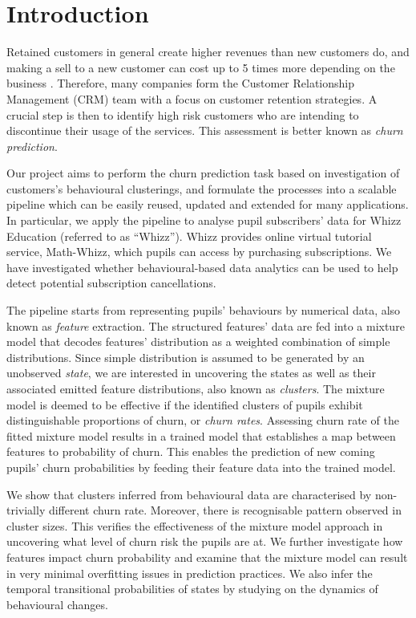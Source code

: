 \section{Introduction}
\label{sec:intro}

Retained customers in general create higher revenues than new customers do, and making a sell to a new customer can cost up to 5 times more depending on the business \cite{Slater2000}. Therefore, many companies form the Customer Relationship Management (CRM) team with a focus on customer retention strategies. A crucial step is then to identify high risk customers who are intending to discontinue their usage of the services. This assessment is better known as \textit{churn prediction}.

Our project aims to perform the churn prediction task based on investigation of customers's behavioural clusterings, and formulate the processes into a scalable pipeline which can be easily reused, updated and extended for many applications. In particular, we apply the pipeline to analyse pupil subscribers' data for Whizz Education (referred to as ``Whizz''). Whizz provides online virtual tutorial service, Math-Whizz, which pupils can access by purchasing subscriptions. We have investigated whether behavioural-based data analytics can be used to help detect potential subscription cancellations.

The pipeline starts from representing pupils' behaviours by numerical data, also known as \textit{feature} extraction. The structured features' data are fed into a mixture model that decodes features' distribution as a weighted combination of simple distributions. Since simple distribution is assumed to be generated by an unobserved \textit{state}, we are interested in uncovering the states as well as their associated emitted feature distributions, also known as \textit{clusters}. The mixture model is deemed to be effective if the identified clusters of pupils exhibit distinguishable proportions of churn, or \textit{churn rates}. Assessing churn rate of the fitted mixture model results in a trained model that establishes a map between features to probability of churn. This enables the prediction of new coming pupils' churn probabilities by feeding their feature data into the trained model.

We show that clusters inferred from behavioural data are characterised by non-trivially different churn rate. Moreover, there is recognisable pattern observed in cluster sizes. This verifies the effectiveness of the mixture model approach in uncovering what level of churn risk the pupils are at. We further investigate how features impact churn probability and examine that the mixture model can result in very minimal overfitting issues in prediction practices. We also infer the temporal transitional probabilities of states by studying on the dynamics of behavioural changes.

